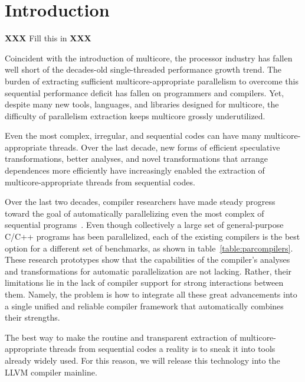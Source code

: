 \section{Introduction}

\textbf{XXX} Fill this in \textbf{XXX}


Coincident with the introduction of multicore, the processor industry has
fallen well short of the decades-old single-threaded performance growth
trend. The burden of extracting sufficient multicore-appropriate parallelism
to overcome this sequential performance deficit has fallen on programmers
and compilers. Yet, despite many new tools, languages, and libraries
designed for multicore, the difficulty of parallelism extraction keeps
multicore grossly underutilized.

Even the most complex, irregular, and sequential codes can have many
multicore-appropriate threads.  Over the last decade, new forms of efficient
speculative transformations, better analyses, and novel transformations that
arrange dependences more efficiently have increasingly enabled the
extraction of multicore-appropriate threads from sequential codes.

Over the last two decades, compiler researchers have made steady progress
toward the goal of automatically parallelizing even the most complex of
sequential programs~\cite{Campanoni:2012:HAP:2259016.2259028,
johnson:12:pldi, kim:12:cgo, kim:10:micro, raman:10:asplos,
ottoni:05:micro, raman:cgo:08, malhke-doall paper, johnson:17:cgo}.
%
Even though collectively a large set of general-purpose C/C++ programs has
been parallelized, each of the existing compilers is the best option for a
different set of benchmarks, as shown in table~\ref{table:parcompilers}.
%
These research prototypes show that the capabilities of the compiler's
analyses and transformations for automatic parallelization are not lacking.
Rather, their limitations lie in the lack of compiler support for strong
interactions between them.
%
Namely, the problem is how to integrate all these great advancements into a
single unified and reliable compiler framework that automatically combines
their strengths.

The best way to make the routine and transparent extraction of
multicore-appropriate threads from sequential codes a reality is to sneak it
into tools already widely used.  For this reason, we will release this
technology into the LLVM compiler mainline.


